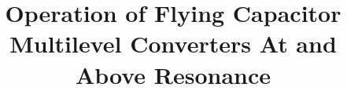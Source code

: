 \documentclass[journal, onecolumn, final, letterpaper, 10pt]{IEEEtran}
\title{Operation of Flying Capacitor Multilevel Converters At and Above Resonance}
\begin{document}
\begin{spacing}{1.75}


\begin{spacing}{1.0}
\maketitle
\end{spacing}

\vspace{-1em}
\begin{spacing}{1.2}

\end{spacing}

	




\vspace{-12pt}
\end{spacing}
%
\singlespacing 


%
\end{document}
